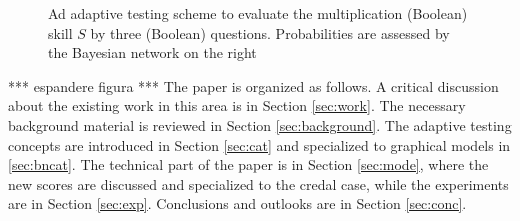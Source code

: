 \documentclass[runningheads]{llncs}
\begin{document}
\begin{figure}[htp!]
\centering
{}
\caption{Ad adaptive testing scheme to evaluate the multiplication (Boolean) skill $S$ by three (Boolean) questions. Probabilities are assessed by the Bayesian network on the right}
    \label{fig:minicat}
\end{figure}
*** espandere figura ***
\newpage 
The paper is organized as follows. A critical discussion about the existing work in this area is in Section \ref{sec:work}. The necessary background material is reviewed in Section \ref{sec:background}. The adaptive testing concepts are introduced in Section \ref{sec:cat} and specialized to graphical models in \ref{sec:bncat}. The technical part of the paper is in Section \ref{sec:mode}, where the new scores are discussed and specialized to the credal case, while the experiments are in Section \ref{sec:exp}. Conclusions and outlooks are in Section \ref{sec:conc}.
\end{document}
